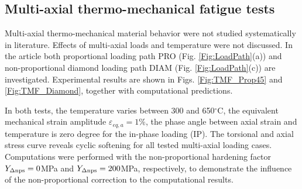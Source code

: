 \documentclass[preprint,5p,twocolumn,11pt,sort&compress]{elsarticle}
\begin{document}
\begin{figure*}
\caption{Experimental and computational results for the diamond strain path under in-phase thermo-mechanical loading conditions with varying temperature between  300 and 650$^{\circ}$C. (a) The first loading cycle. (b) The half life loading cycle. (c) Axial peak-valley normal stress as function of loading cycles. (d) Torsional peak-valley shear stress as function of  loading cycles.}
\label{Fig:TMF_Diamond}
\end{figure*}

\subsection{Multi-axial thermo-mechanical fatigue tests}
\noindent
Multi-axial thermo-mechanical material behavior were not studied systematically in literature. Effects of multi-axial loads and temperature were not discussed. In the article both proportional loading path PRO (Fig. \ref{Fig:LoadPath}(a)) and non-proportional diamond loading path DIAM (Fig. \ref{Fig:LoadPath}(c)) are investigated. Experimental results are shown in Figs. \ref{Fig:TMF_Prop45} and \ref{Fig:TMF_Diamond}, together with computational predictions.

In both tests, the temperature varies between 300 and 650$^{\circ}$C, the equivalent mechanical strain amplitude $\varepsilon_{eq,a}=1\%$, the phase angle between axial strain and temperature is zero degree for the in-phase loading (IP).
The torsional and axial stress curve reveals cyclic softening for all tested multi-axial loading cases.
Computations were performed with the non-proportional hardening factor $Y_{\rm \Delta nps}=0$MPa and $Y_{\rm \Delta nps}=200$MPa, respectively, to demonstrate the influence of the non-proportional correction to the computational results.
\end{document}
